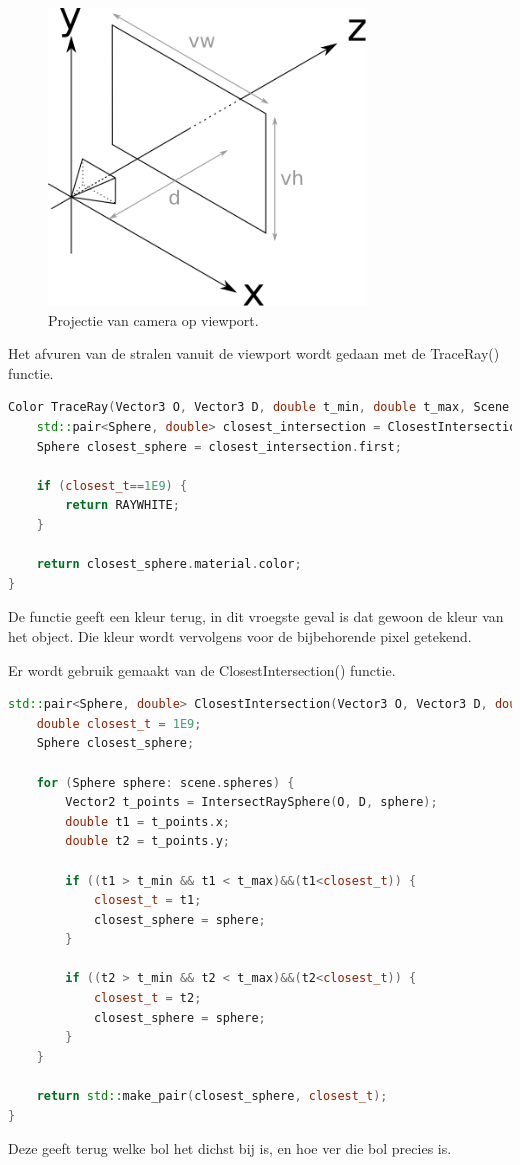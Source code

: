 \documentclass[12pt, a4paper]{article}
\begin{document}
\begin{figure}[h]
    \centering
    \includegraphics[width=0.75\textwidth]{viewport.png}
    \caption{Projectie van camera op viewport.}
    \label{fig:viewport}
\end{figure}

Het afvuren van de stralen vanuit de viewport wordt gedaan met de TraceRay() functie.

\begin{lstlisting}[language=C++]
Color TraceRay(Vector3 O, Vector3 D, double t_min, double t_max, Scene scene) {   
    std::pair<Sphere, double> closest_intersection = ClosestIntersection(O, D, t_min, t_max, scene);
    Sphere closest_sphere = closest_intersection.first;

    if (closest_t==1E9) {
        return RAYWHITE;
    }

    return closest_sphere.material.color;
}
\end{lstlisting}
De functie geeft een kleur terug, in dit vroegste geval is dat gewoon de kleur van het object. Die kleur wordt vervolgens voor de bijbehorende pixel getekend.

Er wordt gebruik gemaakt van de ClosestIntersection() functie. 

\begin{lstlisting}[language=C++]
std::pair<Sphere, double> ClosestIntersection(Vector3 O, Vector3 D, double t_min, double t_max, Scene scene) {
    double closest_t = 1E9;
    Sphere closest_sphere;

    for (Sphere sphere: scene.spheres) {
        Vector2 t_points = IntersectRaySphere(O, D, sphere);
        double t1 = t_points.x;
        double t2 = t_points.y;

        if ((t1 > t_min && t1 < t_max)&&(t1<closest_t)) {
            closest_t = t1;
            closest_sphere = sphere;
        }

        if ((t2 > t_min && t2 < t_max)&&(t2<closest_t)) {
            closest_t = t2;
            closest_sphere = sphere;
        }
    }

    return std::make_pair(closest_sphere, closest_t);
}
\end{lstlisting}
Deze geeft terug welke bol het dichst bij is, en hoe ver die bol precies is. 
\end{document}
